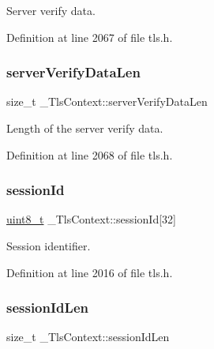Server verify data. 



Definition at line 2067 of file tls.\+h.

\mbox{\label{struct__TlsContext_ae0e1a4d25bf7c88c2548c40c8247b7eb}} 
\subsubsection{\texorpdfstring{server\+Verify\+Data\+Len}{serverVerifyDataLen}}
{\footnotesize\ttfamily size\+\_\+t \+\_\+\+Tls\+Context\+::server\+Verify\+Data\+Len}



Length of the server verify data. 



Definition at line 2068 of file tls.\+h.

\mbox{\label{struct__TlsContext_a8584fd913e0e95d7352ebc127ac76e20}} 
\subsubsection{\texorpdfstring{session\+Id}{sessionId}}
{\footnotesize\ttfamily \hyperlink{stdint_8h_aba7bc1797add20fe3efdf37ced1182c5}{uint8\+\_\+t} \+\_\+\+Tls\+Context\+::session\+Id\mbox{[}32\mbox{]}}



Session identifier. 



Definition at line 2016 of file tls.\+h.

\mbox{\label{struct__TlsContext_a1a592ab1d273039d45b71b0356148bb2}} 
\subsubsection{\texorpdfstring{session\+Id\+Len}{sessionIdLen}}
{\footnotesize\ttfamily size\+\_\+t \+\_\+\+Tls\+Context\+::session\+Id\+Len}




